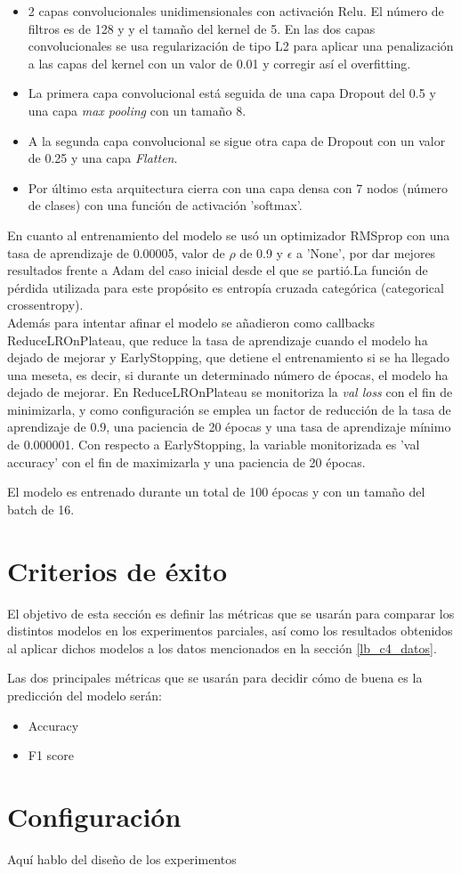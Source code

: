 \documentclass[11pt,a4paper,spanish]{book}
\begin{document}
	\begin{itemize}
		\item 2 capas convolucionales unidimensionales con activación Relu. El número de filtros es de 128 y  y el tamaño del kernel de 5.
		En las dos capas convolucionales se usa regularización de tipo L2 para aplicar una penalización a las capas del kernel con un valor de 0.01 y corregir así el overfitting.
		
		\item La primera capa convolucional está seguida de una capa Dropout del 0.5 y una capa \emph{max pooling} con un tamaño 8.
		
		\item A la segunda capa convolucional se sigue otra capa de Dropout con un valor de 0.25 y una capa \emph{Flatten}.
		
		\item Por último esta arquitectura cierra con una capa densa con 7 nodos (número de clases) con una función de activación 'softmax'.
	\end{itemize}
	En cuanto al entrenamiento del modelo se usó un optimizador RMSprop con una tasa de aprendizaje de 0.00005, valor de $\rho$ de 0.9 y $\epsilon$ a 'None', por dar mejores resultados frente a Adam del caso inicial desde el que se partió.La función de pérdida utilizada para este propósito es entropía cruzada categórica (categorical crossentropy).\\
	
	Además para intentar afinar el modelo se añadieron como callbacks ReduceLROnPlateau, que reduce la tasa de aprendizaje cuando el modelo ha dejado de mejorar y EarlyStopping, que detiene el entrenamiento si se ha llegado una meseta, es decir, si durante un determinado número de épocas, el modelo ha dejado de mejorar. En ReduceLROnPlateau se monitoriza la \emph{val loss} con el fin de minimizarla, y como configuración se emplea un factor de reducción de la tasa de aprendizaje de 0.9, una paciencia de 20 épocas y una tasa de aprendizaje mínimo de 0.000001.
	Con respecto a EarlyStopping, la variable monitorizada es 'val accuracy' con el fin de maximizarla y una paciencia de 20 épocas.
	
	El modelo es entrenado durante un total de 100 épocas y con un tamaño del batch de 16.
	
	\section{Criterios de éxito}
	El objetivo de esta sección es definir las métricas que se usarán para comparar los distintos modelos en los experimentos parciales, así como los resultados obtenidos al aplicar dichos modelos a los datos mencionados en la sección \ref{lb_c4_datos}.
	
	Las dos principales métricas que se usarán para decidir cómo de buena es la predicción del modelo serán:
	\begin{itemize}
		\item Accuracy
		\item F1 score
	\end{itemize}
	
	
	\section{Configuración}
	Aquí hablo del  diseño de los experimentos
	
	
		\printbibliography
	
\end{document}
